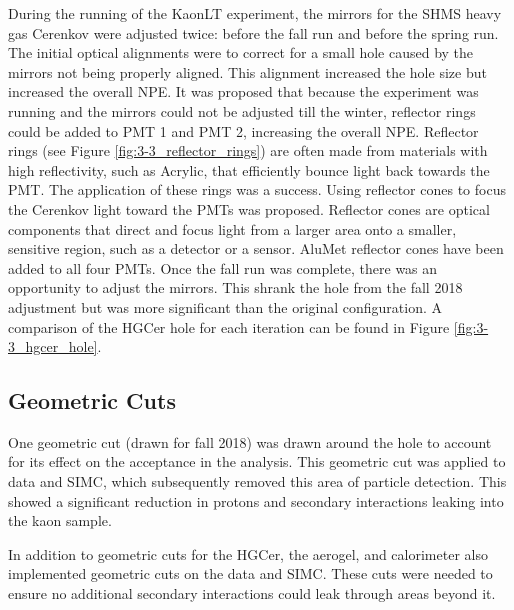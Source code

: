 \documentclass[
]{report}
\begin{document}


During the running of the KaonLT experiment, the mirrors for the SHMS
heavy gas Cerenkov were adjusted twice: before the fall run and before
the spring run. The initial optical alignments were to correct for a
small hole caused by the mirrors not being properly aligned. This
alignment increased the hole size but increased the overall NPE. It was
proposed that because the experiment was running and the mirrors could
not be adjusted till the winter, reflector rings could be added to PMT 1
and PMT 2, increasing the overall NPE. Reflector rings (see Figure
\ref{fig:3-3_reflector_rings}) are often made from materials with high
reflectivity, such as Acrylic, that efficiently bounce light back
towards the PMT. The application of these rings was a success. Using
reflector cones to focus the Cerenkov light toward the PMTs was
proposed. Reflector cones are optical components that direct and focus
light from a larger area onto a smaller, sensitive region, such as a
detector or a sensor. AluMet reflector cones have been added to all four
PMTs. Once the fall run was complete, there was an opportunity to adjust
the mirrors. This shrank the hole from the fall 2018 adjustment but was
more significant than the original configuration. A comparison of the
HGCer hole for each iteration can be found in Figure
\ref{fig:3-3_hgcer_hole}.



\hypertarget{geometric-cuts}{%
\subsection{\texorpdfstring{Geometric Cuts
\label{Chapter-3-3-2}}{Geometric Cuts }}\label{geometric-cuts}}

One geometric cut (drawn for fall 2018) was drawn around the hole to
account for its effect on the acceptance in the analysis. This geometric
cut was applied to data and SIMC, which subsequently removed this area
of particle detection. This showed a significant reduction in protons
and secondary interactions leaking into the kaon sample.



In addition to geometric cuts for the HGCer, the aerogel, and
calorimeter also implemented geometric cuts on the data and SIMC. These
cuts were needed to ensure no additional secondary interactions could
leak through areas beyond it.
\end{document}
